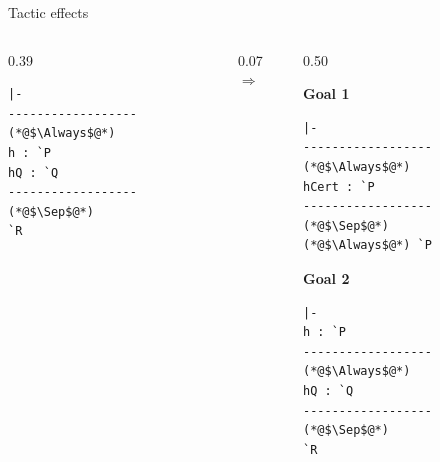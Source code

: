 \documentclass[10pt,aspectratio=169]{beamer}
\begin{document}
\begin{frame}[fragile]{Tactic effects}
  \begin{columns}[c,onlytextwidth]
    \begin{column}{0.39\textwidth}
\begin{lstlisting}[style=leancode]
|-
------------------ (*@$\Always$@*)
h : `P
hQ : `Q
------------------ (*@$\Sep$@*)
`R
\end{lstlisting}
    \end{column}
    \begin{column}{0.07\textwidth}
      \centering\Large$\Longrightarrow$
    \end{column}
    \begin{column}{0.50\textwidth}
      \par\vspace{0.08cm}
      {\small\bfseries Goal 1\par}
\begin{lstlisting}[style=leancode]
|-
------------------ (*@$\Always$@*)
hCert : `P
------------------ (*@$\Sep$@*)
(*@$\Always$@*) `P
\end{lstlisting}
      {\small\bfseries Goal 2\par}
\begin{lstlisting}[style=leancode]
|-
h : `P
------------------ (*@$\Always$@*)
hQ : `Q
------------------ (*@$\Sep$@*)
`R
\end{lstlisting}
    \end{column}
  \end{columns}
\end{frame}
\end{document}
